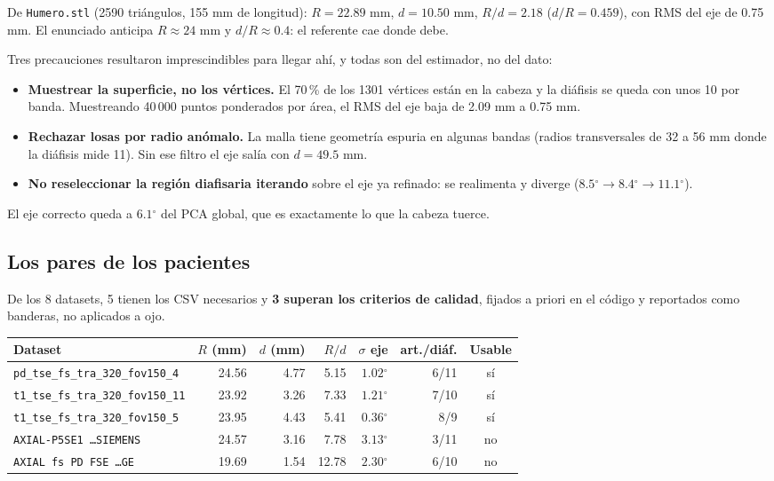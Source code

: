 \documentclass[11pt,a4paper]{article}
\providecommand{\degree}{\ensuremath{^\circ}}
\newcommand{\Rd}{\ensuremath{R/d}}
\begin{document}
De \texttt{Humero.stl} (2590 triángulos, 155 mm de longitud):
$R = 22.89$ mm, $d = 10.50$ mm, $\Rd = 2.18$ ($d/R = 0.459$), con RMS del eje de 0.75 mm.
El enunciado anticipa $R \approx 24$ mm y $d/R \approx 0.4$: el referente cae donde debe.

Tres precauciones resultaron imprescindibles para llegar ahí, y todas son del estimador,
no del dato:

\begin{itemize}[leftmargin=1.2em,itemsep=1pt]
\item \textbf{Muestrear la superficie, no los vértices.} El 70\,\% de los 1301 vértices están
en la cabeza y la diáfisis se queda con unos 10 por banda. Muestreando 40\,000 puntos
ponderados por área, el RMS del eje baja de 2.09 mm a 0.75 mm.
\item \textbf{Rechazar losas por radio anómalo.} La malla tiene geometría espuria en algunas
bandas (radios transversales de 32 a 56 mm donde la diáfisis mide 11). Sin ese filtro el eje
salía con $d = 49.5$ mm.
\item \textbf{No reseleccionar la región diafisaria iterando} sobre el eje ya refinado: se
realimenta y diverge ($8.5\degree \to 8.4\degree \to 11.1\degree$).
\end{itemize}

El eje correcto queda a $6.1\degree$ del PCA global, que es exactamente lo que la cabeza tuerce.

\subsection{Los pares de los pacientes}

De los 8 datasets, 5 tienen los CSV necesarios y \textbf{3 superan los criterios de calidad},
fijados a priori en el código y reportados como banderas, no aplicados a ojo.

\begin{center}
\begin{tabular}{@{}l r r r r r c@{}}
\toprule
\textbf{Dataset} & \textbf{$R$ (mm)} & \textbf{$d$ (mm)} & \textbf{\Rd} &
\textbf{$\sigma$ eje} & \textbf{art./diáf.} & \textbf{Usable} \\
\midrule
\texttt{pd\_tse\_fs\_tra\_320\_fov150\_4}  & 24.56 & 4.77 & 5.15 & $1.02\degree$ & 6/11 & sí \\
\texttt{t1\_tse\_fs\_tra\_320\_fov150\_11} & 23.92 & 3.26 & 7.33 & $1.21\degree$ & 7/10 & sí \\
\texttt{t1\_tse\_fs\_tra\_320\_fov150\_5}  & 23.95 & 4.43 & 5.41 & $0.36\degree$ & 8/9  & sí \\
\texttt{AXIAL-P5SE1 \ldots SIEMENS}        & 24.57 & 3.16 & 7.78 & $3.13\degree$ & 3/11 & no \\
\texttt{AXIAL fs PD FSE \ldots GE}         & 19.69 & 1.54 & 12.78 & $2.30\degree$ & 6/10 & no \\
\bottomrule
\end{tabular}
\end{center}
\end{document}
